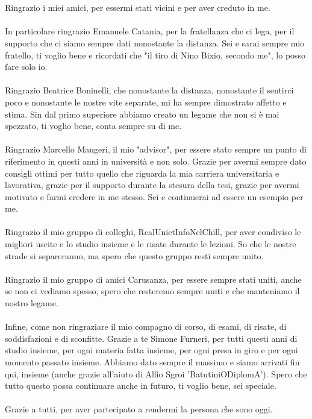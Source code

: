 \\\\Ringrazio i miei amici, per essermi stati vicini e per aver creduto in me.
\\\\In particolare ringrazio Emanuele Catania, per la fratellanza che ci lega, per il supporto che ci siamo sempre dati nonostante la distanza. Sei e sarai sempre mio fratello, ti voglio bene e ricordati che "il tiro di Nino Bixio, secondo me", lo posso fare solo io.
\\\\Ringrazio Beatrice Boninelli, che nonostante la distanza, nonostante il sentirci poco e nonostante le nostre vite separate, mi ha sempre dimostrato affetto e stima. Sin dal primo superiore abbiamo creato un legame che non si è mai spezzato, ti voglio bene, conta sempre su di me.
\\\\Ringrazio Marcello Maugeri, il mio "advisor", per essere stato sempre un punto di riferimento in questi anni in università e non solo. Grazie per avermi sempre dato consigli ottimi per tutto quello che riguarda la mia carriera universitaria e lavorativa, grazie per il supporto durante la stesura della tesi, grazie per avermi motivato e farmi credere in me stesso. Sei e continuerai ad essere un esempio per me.
\\\\Ringrazio il mio gruppo di colleghi, RealUnictInfoNelChill, per aver condiviso le migliori uscite e lo studio insieme e le risate durante le lezioni. So che le nostre strade si separeranno, ma spero che questo gruppo resti sempre unito.
\\\\Ringrazio il mio gruppo di amici Carusanza, per essere sempre stati uniti, anche se non ci vediamo spesso, spero che resteremo sempre uniti e che manteniamo il nostro legame.
\\\\Infine, come non ringraziare il mio compagno di corso, di esami, di risate, di soddisfazioni e di sconfitte. Grazie a te Simone Furneri, per tutti questi anni di studio insieme, per ogni materia fatta insieme, per ogni presa in giro e per ogni momento passato insieme. Abbiamo dato sempre il massimo e siamo arrivati fin qui, insieme (anche grazie all'aiuto di Alfio Sgroi 'BatutiniODiplomA'). Spero che tutto questo possa continuare anche in futuro, ti voglio bene, sei speciale.
\\\\Grazie a tutti, per aver partecipato a rendermi la persona che sono oggi.
